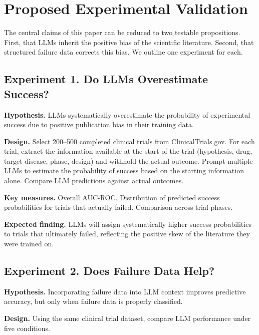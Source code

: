 \section{Proposed Experimental Validation}
\label{sec:future}

The central claims of this paper can be reduced to two testable
propositions. First, that LLMs inherit the positive bias of the
scientific literature. Second, that structured failure data corrects
this bias. We outline one experiment for each.

\subsection{Experiment 1. Do LLMs Overestimate Success?}

\textbf{Hypothesis.} LLMs systematically overestimate the
probability of experimental success due to positive publication bias
in their training data.

\textbf{Design.} Select 200--500 completed clinical trials from
ClinicalTrials.gov. For each trial, extract the information available
at the start of the trial (hypothesis, drug, target disease, phase,
design) and withhold the actual outcome. Prompt multiple LLMs to
estimate the probability of success based on the starting information
alone. Compare LLM predictions against actual outcomes.

\textbf{Key measures.} Overall AUC-ROC. Distribution of predicted
success probabilities for trials that actually failed. Comparison
across trial phases.

\textbf{Expected finding.} LLMs will assign systematically higher
success probabilities to trials that ultimately failed, reflecting
the positive skew of the literature they were trained on.

\subsection{Experiment 2. Does Failure Data Help?}

\textbf{Hypothesis.} Incorporating failure data into LLM context
improves predictive accuracy, but only when failure data is properly
classified.

\textbf{Design.} Using the same clinical trial dataset, compare LLM
performance under five conditions.

